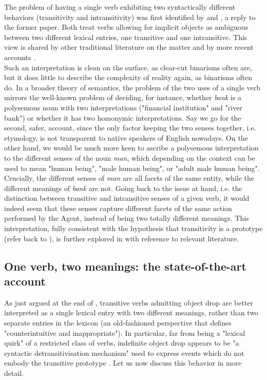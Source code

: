 The problem of having a single verb exhibiting two syntactically different behaviors (transitivity and intransitivity) was first identified by \textcite{fodor1980functional} and \textcite{dowty1981quantification}, a reply to the former paper. Both treat verbs allowing for implicit objects as ambiguous between two different lexical entries, one transitive and one intransitive. This view is shared by other traditional literature on the matter \parencite{Cote1996, Mittwoch1982, vanvalinlapolla1997syntax, brisson1994licensing, FellbaumKegl1989taxonomic} and by more recent accounts \parencite{PethoKardos2006, BourmayanRecanati2013}.\\
Such an interpretation is clean on the surface, as clear-cut binarisms often are, but it does little to describe the complexity of reality \textemdash again, as binarisms often do. In a broader theory of semantics, the problem of the two uses of a single verb mirrors the well-known problem of deciding, for instance, whether \textit{bank} is a polysemous noun with two interpretations ("financial institution" and "river bank") or whether it has two homonymic interpretations. Say we go for the second, safer, account, since the only factor keeping the two senses together, i.e. etymology, is not transparent to native speakers of English nowadays. On the other hand, we would be much more keen to ascribe a polysemous interpretation to the different senses of the noun \textit{man}, which depending on the context can be used to mean "human being", "male human being", or "adult male human being". Crucially, the different senses of \textit{man} are all facets of the same entity, while the different meanings of \textit{bank} are not. Going back to the issue at hand, i.e. the distinction between transitive and intransitive senses of a given verb, it would indeed seem that these senses capture different facets of the same action performed by the Agent, instead of being two totally different meanings. This interpretation, fully consistent with the hypothesis that transitivity is a prototype (refer back to ), is further explored in  with reference to relevant literature.


\subsection{One verb, two meanings: the state-of-the-art account} 

As just argued at the end of , transitive verbs admitting object drop are better interpreted as a single lexical entry with two different meanings, rather than two separate entries in the lexicon (an old-fashioned perspective that \textcite[60]{Lorenzetti2008} defines "counterintuitive and inappropriate"). In particular, far from being a "lexical quirk" of a restricted class of verbs, indefinite object drop appears to be "a syntactic detransitivisation mechanism" used to express events which do not embody the transitive prototype \parencite[134]{Naess2007}. Let us now discuss this behavior in more detail.

